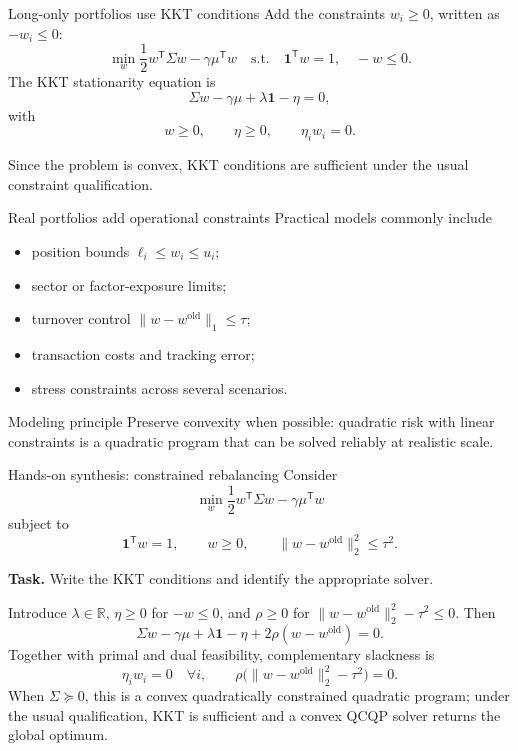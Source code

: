\documentclass[aspectratio=169,11pt]{beamer}
\newcommand{\R}{\mathbb{R}}
\newcommand{\trans}{^{\mathsf T}}
\begin{document}
\begin{frame}{Long-only portfolios use KKT conditions}
  Add the constraints $w_i\geq0$, written as $-w_i\leq0$:
  \[
    \min_w\frac12w\trans\Sigma w-\gamma\mu\trans w
    \quad\text{s.t.}\quad
    \mathbf1\trans w=1,
    \quad -w\leq0.
  \]
  The KKT stationarity equation is
  \[
    \Sigma w-\gamma\mu+\lambda\mathbf1-\eta=0,
  \]
  with
  \[
    w\geq0,
    \qquad \eta\geq0,
    \qquad \eta_iw_i=0.
  \]

  Since the problem is convex, KKT conditions are sufficient under the usual
  constraint qualification.
\end{frame}

\begin{frame}{Real portfolios add operational constraints}
  Practical models commonly include
  \begin{itemize}
    \item position bounds $\ell_i\leq w_i\leq u_i$;
    \item sector or factor-exposure limits;
    \item turnover control $\|w-w^{\mathrm{old}}\|_1\leq\tau$;
    \item transaction costs and tracking error;
    \item stress constraints across several scenarios.
  \end{itemize}

  \begin{block}{Modeling principle}
    Preserve convexity when possible: quadratic risk with linear constraints is
    a quadratic program that can be solved reliably at realistic scale.
  \end{block}
\end{frame}

\begin{frame}{Hands-on synthesis: constrained rebalancing}
  \small
  Consider
  \[
    \min_w
    \frac12w\trans\Sigma w-\gamma\mu\trans w
  \]
  subject to
  \[
    \mathbf1\trans w=1,
    \qquad w\geq0,
    \qquad \|w-w^{\mathrm{old}}\|_2^2\leq\tau^2.
  \]

  \textbf{Task.} Write the KKT conditions and identify the appropriate solver.

  \pause
  Introduce $\lambda\in\R$, $\eta\geq0$ for $-w\leq0$, and $\rho\geq0$ for
  $\|w-w^{\mathrm{old}}\|_2^2-\tau^2\leq0$. Then
  \[
  \boxed{
  \Sigma w-\gamma\mu+\lambda\mathbf1-\eta
  +2\rho(w-w^{\mathrm{old}})=0.}
  \]
  Together with primal and dual feasibility, complementary slackness is
  \[
  \boxed{
  \eta_iw_i=0\quad\forall i,
  \qquad
  \rho\bigl(\|w-w^{\mathrm{old}}\|_2^2-\tau^2\bigr)=0.}
  \]
  When $\Sigma\succeq0$, this is a convex quadratically constrained quadratic
  program; under the usual qualification, KKT is sufficient and a convex
  QCQP solver returns the global optimum.
\end{frame}
\end{document}
